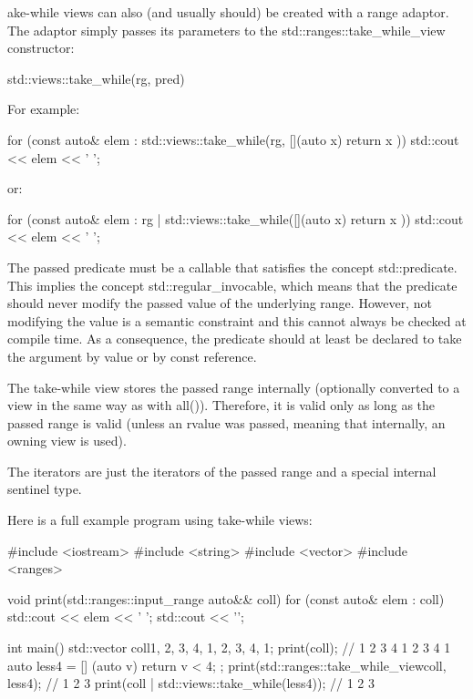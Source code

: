 
ake-while views can also (and usually should) be created with a range adaptor. The adaptor simply passes its parameters to the std::ranges::take\_while\_view constructor:

\begin{cpp}
std::views::take_while(rg, pred)
\end{cpp}

For example:

\begin{cpp}
for (const auto& elem : std::views::take_while(rg, [](auto x) {
						return x %
					})) {
	std::cout << elem << ' ';
}
\end{cpp}

or:

\begin{cpp}
for (const auto& elem : rg | std::views::take_while([](auto x) {
						return x %
					})) {
	std::cout << elem << ' ';
}
\end{cpp}

The passed predicate must be a callable that satisfies the concept std::predicate. This implies the concept std::regular\_invocable, which means that the predicate should never modify the passed value of the underlying range. However, not modifying the value is a semantic constraint and this cannot always be checked at compile time. As a consequence, the predicate should at least be declared to take the argument by value or by const reference.

The take-while view stores the passed range internally (optionally converted to a view in the same way as with all()). Therefore, it is valid only as long as the passed range is valid (unless an rvalue was passed, meaning that internally, an owning view is used).

The iterators are just the iterators of the passed range and a special internal sentinel type.

Here is a full example program using take-while views:


\begin{cpp}
#include <iostream>
#include <string>
#include <vector>
#include <ranges>

void print(std::ranges::input_range auto&& coll)
{
	for (const auto& elem : coll) {
		std::cout << elem << ' ';
	}
	std::cout << '\n';
}

int main()
{
	std::vector coll{1, 2, 3, 4, 1, 2, 3, 4, 1};
	print(coll); // 1 2 3 4 1 2 3 4 1
	auto less4 = [] (auto v) { return v < 4; };
	print(std::ranges::take_while_view{coll, less4}); // 1 2 3
	print(coll | std::views::take_while(less4)); // 1 2 3
}
\end{cpp}

